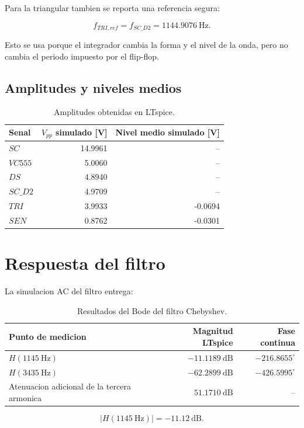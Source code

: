 ﻿\documentclass[11pt,letterpaper]{article}
\begin{document}
Para la triangular tambien se reporta una referencia segura:

\[
f_{TRI,ref}=f_{SC\_D2}=1144.9076~\text{Hz}.
\]

Esto se usa porque el integrador cambia la forma y el nivel de la onda, pero
no cambia el periodo impuesto por el flip-flop.

\subsection{Amplitudes y niveles medios}

\begin{table}[H]
\centering
\begin{tabular}{lrr}
\toprule
Senal & \(V_{pp}\) simulado [V] & Nivel medio simulado [V] \\
\midrule
\(SC\) & 14.9961 & -- \\
\(VC555\) & 5.0060 & -- \\
\(DS\) & 4.8940 & -- \\
\(SC\_D2\) & 4.9709 & -- \\
\(TRI\) & 3.9933 & -0.0694 \\
\(SEN\) & 0.8762 & -0.0301 \\
\bottomrule
\end{tabular}
\caption{Amplitudes obtenidas en LTspice.}
\end{table}

\section{Respuesta del filtro}

La simulacion AC del filtro entrega:

\begin{table}[H]
\centering
\begin{tabular}{lrr}
\toprule
Punto de medicion & Magnitud LTspice & Fase continua \\
\midrule
\(H(1145~\text{Hz})\) & \(-11.1189~\text{dB}\) & \(-216.8655^\circ\) \\
\(H(3435~\text{Hz})\) & \(-62.2899~\text{dB}\) & \(-426.5995^\circ\) \\
Atenuacion adicional de la tercera armonica & \(51.1710~\text{dB}\) & -- \\
\bottomrule
\end{tabular}
\caption{Resultados del Bode del filtro Chebyshev.}
\end{table}

\[
|H(1145~\text{Hz})|=-11.12~\text{dB}.
\]
\end{document}
